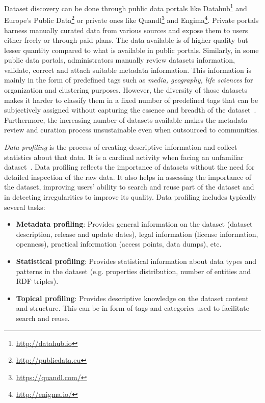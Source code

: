 \documentclass[runningheads,a4paper]{../../Util/LaTEX/llncs}
\begin{document}
Dataset discovery can be done through public data portals like Datahub\footnote{\url{http://datahub.io}} and Europe's Public Data\footnote{\url{http://publicdata.eu}} or private ones like Quandl\footnote{\url{https://quandl.com/}} and Engima\footnote{\url{http://enigma.io/}}. Private portals harness manually curated data from various sources and expose them to users either freely or through paid plans. The data available is of higher quality but lesser quantity compared to what is available in public portals. Similarly, in some public data portals, administrators manually review datasets information, validate, correct and attach suitable metadata information. This information is mainly in the form of predefined tags such as \textit{media, geography, life sciences} for organization and clustering purposes. However, the diversity of those datasets makes it harder to classify them in a fixed number of predefined tags that can be subjectively assigned without capturing the essence and breadth of the dataset~\cite{Lalithsena:WI:13}. Furthermore, the increasing number of datasets available makes the metadata review and curation process unsustainable even when outsourced to communities.

\textit{Data profiling} is the process of creating descriptive information and collect statistics about that data. It is a cardinal activity when facing an unfamiliar dataset~\cite{Li:WISM:12}. Data profiling reflects the importance of datasets without the need for detailed inspection of the raw data.  It also helps in assessing the importance of the dataset, improving users' ability to search and reuse part of the dataset and in detecting irregularities to improve its quality. Data profiling includes typically several tasks:
\begin{itemize}
  \item \textbf{Metadata profiling}: Provides general information on the dataset (dataset description, release and update dates), legal information (license information, openness), practical information (access points, data dumps), etc.
  \item \textbf{Statistical profiling}: Provides statistical information about data types and patterns in the dataset (e.g. properties distribution, number of entities and RDF triples).
  \item \textbf{Topical profiling}: Provides descriptive knowledge on the dataset content and structure. This can be in form of tags and categories used to facilitate search and reuse.
\end{itemize}
\end{document}
